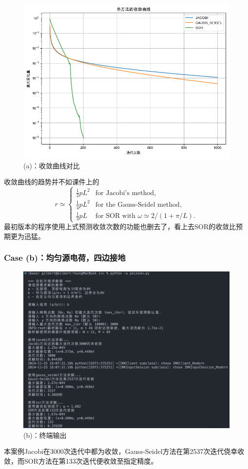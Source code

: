 \begin{figure}[H]
    \centering
    \includegraphics[width=1.0\textwidth]{Problem_1/figs/a_convergence.png}
    \caption{(a)：收敛曲线对比}
\end{figure}
收敛曲线的趋势并不如课件上的
\[
    r \simeq
    \begin{cases}
        \frac{1}{2}pL^2 & \text{for Jacobi's method},                       \\
        \frac{1}{4}pL^2 & \text{for the Gauss-Seidel method},               \\
        \frac{1}{3}pL   & \text{for SOR with } \omega \simeq 2/(1 + \pi/L).
    \end{cases}
\]
最初版本的程序使用上式预测收敛次数的功能也删去了，看上去SOR的收敛比预期更为迅猛。
\subsubsection{Case (b)：均匀源电荷，四边接地}
\begin{figure}[H]
    \centering
    \includegraphics[width=1.0\textwidth]{Problem_1/figs/b_terminal.png}
    \caption{(b)：终端输出}
\end{figure}
本案例Jacobi在3000次迭代中都为收敛，Gauss-Seidel方法在第2537次迭代侥幸收敛，而SOR方法在第133次迭代便收敛至指定精度。

